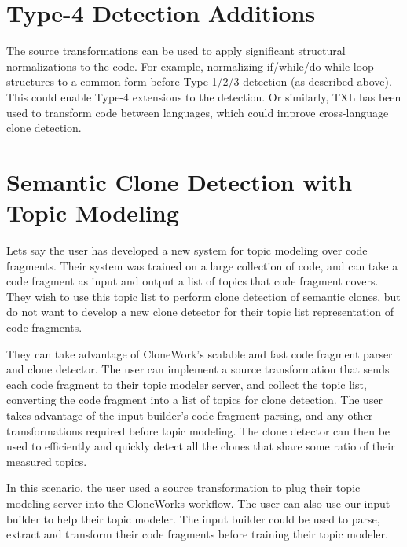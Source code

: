 \documentclass[]{article}
\begin{document}
	\newpage
	\section{Type-4 Detection Additions}
	The source transformations can be used to apply significant structural normalizations to the code.  For example, normalizing if/while/do-while loop structures to a common form before Type-1/2/3 detection (as described above).  This could enable Type-4 extensions to the detection.  Or similarly, TXL has been used to transform code between languages, which could improve cross-language clone detection.
	
	\newpage
	\section{Semantic Clone Detection with Topic Modeling}
	Lets say the user has developed a new system for topic modeling over code fragments.  Their system was trained on a large collection of code, and can take a code fragment as input and output a list of topics that code fragment covers. They wish to use this topic list to perform clone detection of semantic clones, but do not want to develop a new clone detector for their topic list representation of code fragments.
	
	They can take advantage of CloneWork's scalable and fast code fragment parser and clone detector.  The user can implement a source transformation that sends each code fragment to their topic modeler server, and collect the topic list, converting the code fragment into a list of topics for clone detection.  The user takes advantage of the input builder's code fragment parsing, and any other transformations required before topic modeling.  The clone detector can then be used to efficiently and quickly detect all the clones that share some ratio of their measured topics.
	
	In this scenario, the user used a source transformation to plug their topic modeling server into the CloneWorks workflow.  The user can also use our input builder to help their topic modeler.  The input builder could be used to parse, extract and transform their code fragments before training their topic modeler.
\end{document}
